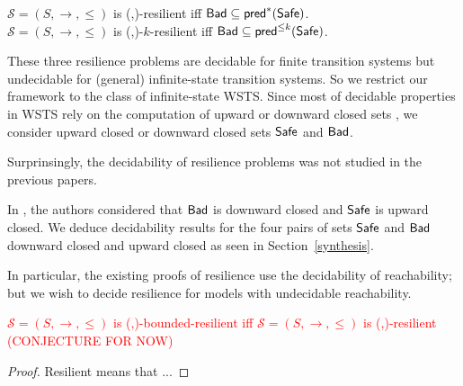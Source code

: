 \begin{remark}[Reformulation]\label{reformulation}
$\mathscr{S}=(S,\rightarrow,\leq)$ is %
(\Bad,\Safe)-resilient iff $\textsf{Bad} \subseteq \textsf{pred}^*(\textsf{Safe})$.\\
$\mathscr{S}=(S,\rightarrow,\leq)$ is %
(\Bad,\Safe)-$k$-resilient iff $\textsf{Bad} \subseteq \textsf{pred}^{\leq k}(\textsf{Safe})$.
\end{remark}

These three resilience problems are decidable for finite transition systems but undecidable for (general) infinite-state transition systems. So we restrict our framework to the class of infinite-state WSTS. Since most of decidable properties in WSTS rely on the computation of upward or downward closed sets \cite{DBLP:journals/iandc/AbdullaCJT00, DBLP:journals/tcs/FinkelS01}, we consider upward closed or downward closed sets $\textsf{Safe}$ and $\textsf{Bad}$.

Surprinsingly, the decidability of resilience problems was not studied in the previous papers.

In \cite{DBLP:journals/corr/abs-2108-00889}, the authors considered that $\textsf{Bad}$ is downward closed and $\textsf{Safe}$ is upward closed.
%		
We deduce 
decidability results for the four pairs of sets $\textsf{Safe}$ and $\textsf{Bad}$ downward closed and upward closed as seen in Section~\ref{synthesis}.

In particular, the existing proofs of resilience use the decidability of reachability; but we wish to decide resilience for models with undecidable reachability.
%






\iffalse

\begin{proposition}\label{general}
\textcolor{red}{
$\mathscr{S}=(S,\rightarrow,\leq)$ is %
(\Bad,\Safe)-bounded-resilient iff $\mathscr{S}=(S,\rightarrow,\leq)$ is %
(\Bad,\Safe)-resilient (CONJECTURE FOR NOW)
}
\end{proposition}

\begin{proof}
Resilient means that ...
\end{proof}

